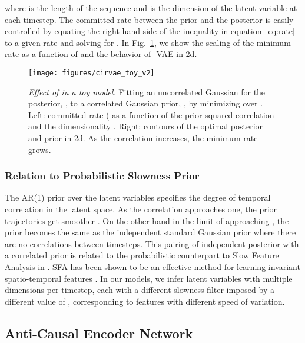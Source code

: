 \documentclass{article} \usepackage{iclr2019_conference,times}
\def\figref#1{figure~\ref{#1}}
\def\eqref#1{equation~\ref{#1}}
\renewcommand{\figref}[1]{Fig.~\ref{#1}}
\begin{document}
where  is the length of the sequence and  is the dimension of the latent variable at each timestep. The committed rate between the prior and the posterior is easily controlled by equating the right hand side of the inequality in \eqref{eq:rate} to a given rate  and solving for . In  \figref{fig:toy}, we show the scaling of the minimum rate as a function of  and the behavior of -VAE in 2d.

\begin{figure}[h]
    \centering
    \texttt{[image: figures/cirvae\_toy\_v2]}
    \vspace{-3mm}
\caption{{\em Effect of  in a toy model.} Fitting an uncorrelated Gaussian for the posterior, , to a correlated Gaussian prior, , by minimizing  over . Left: committed rate ( as a function of the prior squared correlation  and the  dimensionality . Right: contours of the optimal posterior and prior in 2d. As the correlation increases, the minimum rate grows.} 
    \label{fig:toy}

\end{figure}

\subsubsection{Relation to Probabilistic Slowness Prior}
The AR(1) prior over the latent variables specifies the degree of temporal correlation in the latent space. As the correlation  approaches one, the prior trajectories get smoother . On the other hand in the limit of  approaching , the prior becomes the same as the independent standard Gaussian prior where there are no correlations between timesteps. This pairing of independent posterior with a correlated prior is related to the probabilistic counterpart to Slow Feature Analysis \citep{SFA} in \citet{TurnerSahani}. 
SFA has been shown to be an effective method for learning invariant spatio-temporal features \citep{SFA}. In our models, we infer latent variables with multiple dimensions per timestep, each with a different slowness filter imposed by a different value of , corresponding to features with different speed of variation. 


\subsection{Anti-Causal Encoder Network}\label{sec:anticausal}
\end{document}
